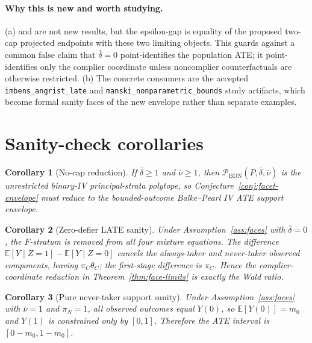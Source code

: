 \documentclass[11pt]{article}
\newcommand{\E}{\mathbb{E}}
\theoremstyle{definition}
\theoremstyle{plain}
\newtheorem{corollary}{Corollary}
\theoremstyle{remark}
\begin{document}
\paragraph{Why this is new and worth studying.}
(a) \citet{ImbensAngrist1994} and \citet{Manski1990} are not new results, but
the epsilon-gap is equality of the proposed two-cap projected endpoints with
these two limiting objects.  This guards against a common false claim that
\(\bar\delta=0\) point-identifies the population ATE; it point-identifies only
the complier coordinate unless noncomplier counterfactuals are otherwise
restricted.  (b) The concrete consumers are the accepted
\texttt{imbens\_angrist\_late} and \texttt{manski\_nonparametric\_bounds}
study artifacts, which become formal sanity faces of the new envelope rather
than separate examples.

\section{Sanity-check corollaries}
\begin{corollary}[No-cap reduction]\label{cor:no-cap}
If \(\bar\delta\ge1\) and \(\bar\nu\ge1\), then
\(\mathcal{P}_{\mathrm{BDN}}(P,\bar\delta,\bar\nu)\) is the unrestricted
binary-IV principal-strata polytope, so Conjecture~\ref{conj:facet-envelope}
must reduce to the bounded-outcome Balke--Pearl IV ATE support envelope.
\end{corollary}

\begin{corollary}[Zero-defier LATE sanity]\label{cor:late}
Under Assumption~\ref{ass:faces} with \(\bar\delta=0\), the \(F\)-stratum is
removed from all four mixture equations.  The difference
\(\E[Y\mid Z=1]-\E[Y\mid Z=0]\) cancels the always-taker and never-taker
observed components, leaving \(\pi_C\theta_C\); the first-stage difference is
\(\pi_C\).  Hence the complier-coordinate reduction in
Theorem~\ref{thm:face-limits} is exactly the Wald ratio.
\end{corollary}

\begin{corollary}[Pure never-taker support sanity]\label{cor:never}
Under Assumption~\ref{ass:faces} with \(\bar\nu=1\) and \(\pi_N=1\), all
observed outcomes equal \(Y(0)\), so \(\E[Y(0)]=m_0\) and \(Y(1)\) is
constrained only by \([0,1]\).  Therefore the ATE interval is
\([0-m_0,1-m_0]\).
\end{corollary}
\end{document}
